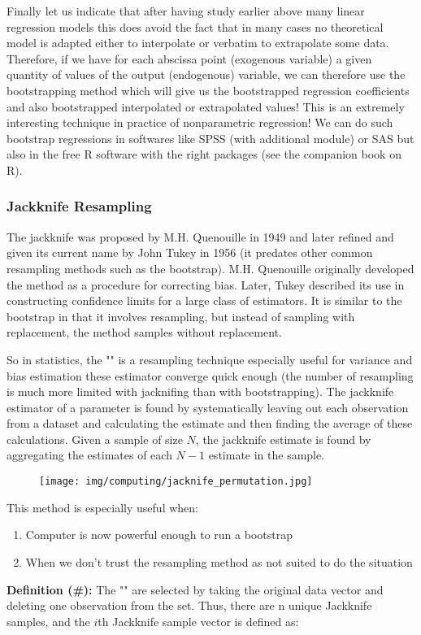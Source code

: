 	Finally let us indicate that after having study earlier above many linear regression models this does avoid the fact that in many cases no theoretical model is adapted either to interpolate or verbatim to extrapolate some data. Therefore, if we have for each abscissa point (exogenous variable) a given quantity of values  of the output (endogenous) variable, we can therefore use the bootstrapping method which will give us the bootstrapped regression coefficients and also bootstrapped interpolated or extrapolated values! This is an extremely interesting technique  in practice of nonparametric regression! We can do such bootstrap regressions in softwares like SPSS (with additional module) or SAS but also in the free R software with the right packages (see the companion book on R).
	
	\pagebreak
	\subsubsection{Jackknife Resampling}\label{jacknife resampling}
	The jackknife was proposed by M.H. Quenouille in 1949 and later refined and given its current name by John Tukey in 1956 (it predates other common resampling methods such as the bootstrap). M.H. Quenouille originally developed the method as a procedure for correcting bias. Later, Tukey described its use in constructing confidence limits for a large class of estimators. It is similar to the bootstrap in that it involves resampling, but instead of sampling with replacement, the method samples without replacement.

	So in statistics, the "" is a resampling technique especially useful for variance and bias estimation these estimator converge quick enough (the number of resampling is much more limited with jacknifing than with bootstrapping). The jackknife estimator of a parameter is found by systematically leaving out each observation from a dataset and calculating the estimate and then finding the average of these calculations. Given a sample of size $N$, the jackknife estimate is found by aggregating the estimates of each $N-1$ estimate in the sample.
	\begin{figure}[H]
		\centering
		\texttt{[image: img/computing/jacknife\_permutation.jpg]}
	\end{figure}
	This method is especially useful when:
	\begin{enumerate}
		\item Computer is now powerful enough to run a bootstrap
		\item When we don't trust the resampling method as not suited to do the situation
	\end{enumerate}
	\textbf{Definition (\#\mydef):} The "" are selected by taking the original data vector and deleting one observation from the set. Thus, there are n unique Jackknife samples, and the $i$th Jackknife sample vector is defined as:

